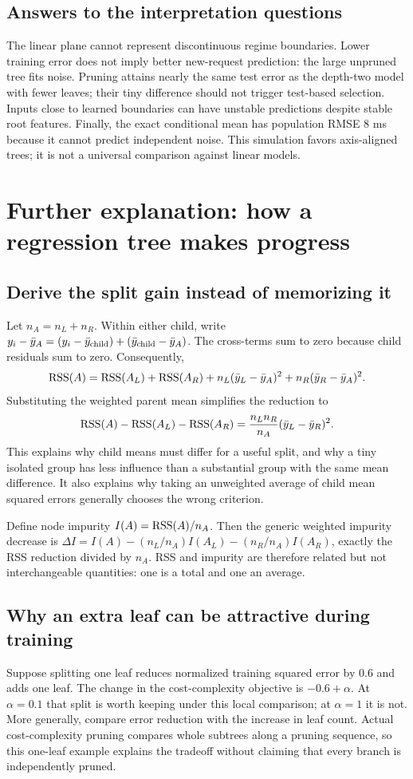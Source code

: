 \subsection*{Answers to the interpretation questions}
The linear plane cannot represent discontinuous regime boundaries. Lower training error does not imply better new-request prediction: the large unpruned tree fits noise. Pruning attains nearly the same test error as the depth-two model with fewer leaves; their tiny difference should not trigger test-based selection. Inputs close to learned boundaries can have unstable predictions despite stable root features. Finally, the exact conditional mean has population RMSE 8 ms because it cannot predict independent noise. This simulation favors axis-aligned trees; it is not a universal comparison against linear models.

\section*{Further explanation: how a regression tree makes progress}
\subsection*{Derive the split gain instead of memorizing it}
Let $n_A=n_L+n_R$. Within either child, write
$y_i-\bar y_A=(y_i-\bar y_{\rm child})+(\bar y_{\rm child}-\bar y_A)$.
The cross-terms sum to zero because child residuals sum to zero. Consequently,
\[
\operatorname{RSS}(A)=\operatorname{RSS}(A_L)+\operatorname{RSS}(A_R)
+n_L(\bar y_L-\bar y_A)^2+n_R(\bar y_R-\bar y_A)^2.
\]
Substituting the weighted parent mean simplifies the reduction to
\[\operatorname{RSS}(A)-\operatorname{RSS}(A_L)-\operatorname{RSS}(A_R)
=\frac{n_Ln_R}{n_A}(\bar y_L-\bar y_R)^2.\]
This explains why child means must differ for a useful split, and why a tiny isolated group has less influence
than a substantial group with the same mean difference. It also explains why taking an unweighted average
of child mean squared errors generally chooses the wrong criterion.

Define node impurity $I(A)=\operatorname{RSS}(A)/n_A$. Then the generic weighted impurity decrease is
$\Delta I=I(A)-(n_L/n_A)I(A_L)-(n_R/n_A)I(A_R)$, exactly the RSS reduction divided by $n_A$.
RSS and impurity are therefore related but not interchangeable quantities: one is a total and one an average.

\subsection*{Why an extra leaf can be attractive during training}
Suppose splitting one leaf reduces normalized training squared error by 0.6 and adds one leaf.
The change in the cost-complexity objective is $-0.6+\alpha$. At $\alpha=0.1$ that split is worth keeping
under this local comparison; at $\alpha=1$ it is not. More generally, compare error reduction with the increase
in leaf count. Actual cost-complexity pruning compares whole subtrees along a pruning sequence, so this
one-leaf example explains the tradeoff without claiming that every branch is independently pruned.

